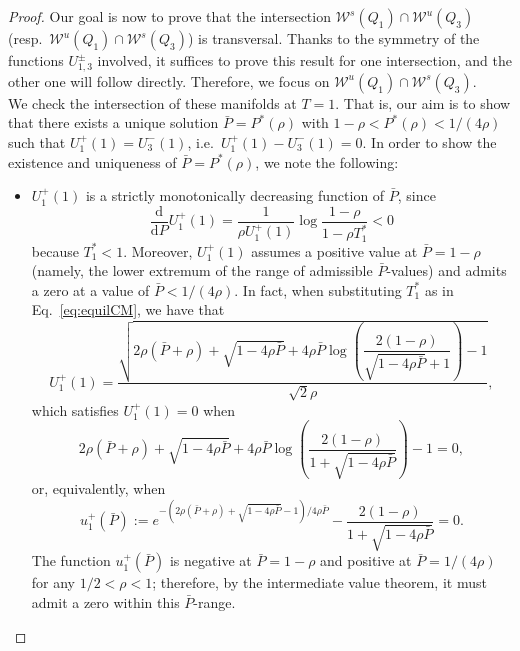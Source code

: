 \documentclass[a4paper,10pt,abstract=true,parskip=true]{scrartcl}
\theoremstyle{remark}
\numberwithin{equation}{section}
\numberwithin{thm}{section}
\begin{document}
\begin{proof}
Our goal is now to prove that the intersection $\mathcal{W}^{s}(Q_1) \cap \mathcal{W}^{u}(Q_3)$ (resp.~$\mathcal{W}^{u}(Q_1) \cap \mathcal{W}^{s}(Q_3)$) is transversal. Thanks to the symmetry of the functions $U_{1,3}^\pm$ involved, it suffices to prove this result for one intersection, and the other one will follow directly. Therefore, we focus on $\mathcal{W}^{u}(Q_1) \cap \mathcal{W}^{s}(Q_3)$.\\
We check the intersection of these manifolds at $T=1$. 
That is, our aim is to show that there exists a unique solution $\bar{P}=P^\ast(\rho)$ with $1-\rho < P^\ast(\rho) < 1/(4\rho)$ such that $U_1^+(1)=U_3^-(1)$, i.e.~$U_1^+(1)-U_3^-(1)=0$. 
In order to show the existence and uniqueness of $\bar{P}=P^\ast(\rho)$, we note the following:
\begin{itemize}
    \item $U_1^+(1)$ is a strictly monotonically decreasing function of $\bar{P}$, since
    \begin{displaymath}
        \frac{\text{d}}{\text{d} P}U_1^+(1) = \frac{1}{\rho U_1^+(1)} \log \frac{1-\rho}{1-\rho T_1^\ast} < 0 
    \end{displaymath}
    because $T_1^\ast<1$. Moreover, $U_1^+(1)$ assumes
    a positive value at $\bar{P}=1-\rho$ (namely, the lower extremum of the range of admissible $\bar{P}$-values) and admits a zero at a value of $\bar{P} < 1/(4\rho)$.
    In fact, when substituting $T_1^\ast$ as in Eq.~\eqref{eq:equilCM}, we have that
    \[
    U_1^+(1) = \frac{\sqrt{2 \rho (\bar{P} + \rho) +\sqrt{1-4 \rho \bar{P} }+4 \rho \bar{P}  \log \left(\dfrac{2(1- \rho) }{\sqrt{1-4 \rho \bar{P} }+1}\right)-1}}{\sqrt{2} \rho },
    \]
    which satisfies $U_1^+(1) = 0 $ when
    \[
    2 \rho (\bar{P} + \rho) +\sqrt{1-4 \rho \bar{P} }+4 \rho \bar{P}  \log \left(\frac{2(1- \rho) }{1+\sqrt{1-4 \rho \bar{P} }}\right)-1=0,
    \]
    or, equivalently, when
    \[
    u_1^+(\bar{P}):=e^{-(2 \rho  (\bar{P}+\rho )+\sqrt{1-4 \rho \bar{P} }-1)/4 \rho \bar{P} }-\frac{2 (1-\rho )}{1+\sqrt{1-4 \rho \bar{P} }} = 0.
    \]
    The function $u_1^+(\bar{P})$ is negative at $\bar{P}=1-\rho$ and positive at $\bar{P}=1/(4 \rho)$ for any $1/2 < \rho < 1$; therefore, by the intermediate value theorem, it must admit a zero within this $\bar{P}$-range. 

\end{itemize}
\end{proof}
\end{document}
